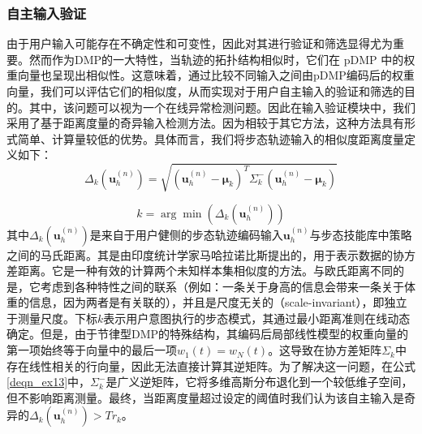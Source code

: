 \subsubsection{自主输入验证}由于用户输入可能存在不确定性和可变性，因此对其进行验证和筛选显得尤为重要。然而作为DMP的一大特性，当轨迹的拓扑结构相似时，它们在 pDMP 中的权重向量也呈现出相似性。这意味着，通过比较不同输入之间由pDMP编码后的权重向量，我们可以评估它们的相似度，从而实现对于用户自主输入的验证和筛选的目的\cite{ijspeertDynamicalMovementPrimitives2013a}。其中，该问题可以视为一个在线异常检测问题。因此在输入验证模块中，我们采用了基于距离度量的奇异输入检测方法。因为相较于其它方法，这种方法具有形式简单、计算量较低的优势。具体而言，我们将步态轨迹输入的相似度距离度量定义如下：
\begin{equation}
  \label{deqn_ex13}
  {\Delta _k}({\pmb{u}}_h^{(n)}) = \sqrt {{{({\pmb{u}}_h^{(n)} - {{\pmb{\mu }}_k})}^T}\Sigma _k^ - ({\pmb{u}}_h^{(n)} - {{\pmb{\mu }}_k})} 
\end{equation}   

\begin{equation}
  \label{deqn_ex14}
  k = \arg \min \left( {{\Delta _k}({\pmb{u}}_h^{(n)})} \right)
\end{equation}
其中${\Delta _k}(\pmb{u}_h^{(n)})$是来自于用户健侧的步态轨迹编码输入${\pmb{u}}_h^{(n)}$与步态技能库中策略之间的马氏距离。其是由印度统计学家马哈拉诺比斯提出的，用于表示数据的协方差距离。它是一种有效的计算两个未知样本集相似度的方法。与欧氏距离不同的是，它考虑到各种特性之间的联系（例如：一条关于身高的信息会带来一条关于体重的信息，因为两者是有关联的），并且是尺度无关的（scale-invariant），即独立于测量尺度。下标$k$表示用户意图执行的步态模式，其通过最小距离准则在线动态确定。但是，由于节律型DMP的特殊结构，其编码后局部线性模型的权重向量的第一项始终等于向量中的最后一项${w_1}(t)={w_N}(t)$。这导致在协方差矩阵${\Sigma _k}$中存在线性相关的行向量，因此无法直接计算其逆矩阵。为了解决这一问题，在公式\ref{deqn_ex13}中，$\Sigma_k^-$是广义逆矩阵，它将多维高斯分布退化到一个较低维子空间，但不影响距离测量。最终，当距离度量超过设定的阈值时我们认为该自主输入是奇异的${\Delta _k}(\pmb{u}_h^{(n)}) > T{r_k}$。  

